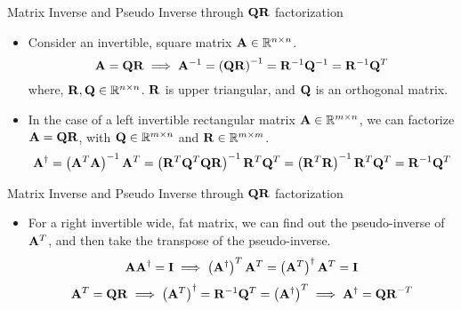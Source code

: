 \documentclass[aspectratio=169]{beamer}
\let\olditem\item
\renewcommand{\item}{\setlength{\itemsep}{\fill}\olditem}
\def\mf{\ensuremath\mathbf}
\def\mb{\ensuremath\mathbb}
\begin{document}
\begin{frame}[t]{Matrix Inverse and Pseudo Inverse through $\mf{QR}$ factorization}
\begin{itemize}
    \item Consider an invertible, square matrix $\mf{A} \in \mb{R}^{n \times n}$. 
    \[ \mf{A} = \mf{QR} \implies \mf{A}^{-1} = \left(\mf{QR}\right)^{-1} = \mf{R}^{-1}\mf{Q}^{-1} = \mf{R}^{-1}\mf{Q}^T \] 
    where, $\mf{R}, \mf{Q} \in \mb{R}^{n \times n}$. $\mf{R}$ is upper triangular, and $\mf{Q}$ is an orthogonal matrix.
    
    \item In the case of a left invertible rectangular matrix $\mf{A} \in \mb{R}^{m \times n}$, we can factorize $\mf{A} = \mf{QR}$, with $\mf{Q} \in \mb{R}^{m \times n}$ and $\mf{R} \in \mb{R}^{m \times m}$.
    \[ \mf{A}^{\dagger} = \left(\mf{A}^T\mf{A}\right)^{-1}\mf{A}^T = \left(\mf{R}^T\mf{Q}^T\mf{QR}\right)^{-1}\mf{R}^T\mf{Q}^T = \left(\mf{R}^T\mf{R}\right)^{-1}\mf{R}^T\mf{Q}^T = \mf{R}^{-1}\mf{Q}^T \]
\end{itemize}
\end{frame}



\begin{frame}[t]{Matrix Inverse and Pseudo Inverse through $\mf{QR}$ factorization}
\begin{itemize}
    \item For a right invertible wide, fat matrix, we can find out the pseudo-inverse of $\mf{A}^T$, and then take the transpose of the pseudo-inverse.
    \[ \mf{AA}^{\dagger} = \mf{I} \implies \left(\mf{A}^{\dagger}\right)^T\mf{A}^T = \left(\mf{A}^T\right)^{\dagger}\mf{A}^T = \mf{I} \]
    \[ \mf{A}^T = \mf{QR} \implies \left(\mf{A}^T\right)^{\dagger} = \mf{R}^{-1}\mf{Q}^T = \left(\mf{A}^{\dagger}\right)^T \implies  \mf{A}^{\dagger} = \mf{QR}^{-T} \]
\end{itemize}
\end{frame}
\end{document}
